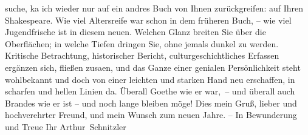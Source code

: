 \begin{ledgroupsized}[t]{13cm}
                        suche, ka{\geminationn} ich wieder nur auf ein andres
                        Buch von Ihnen zurückgreifen: auf Ihren Shakespeare. Wie viel Altersreife
                        war schon in dem früheren Buch, – wie viel Jugendfrische \introOben{}ist\introOben{} in diesem neuen. Welchen Glanz breiten Sie über
                        die Oberflächen; in welche Tiefen dringen Sie, ohne jemals dunkel zu werden.
                        {\pb}Kritische Betrachtung,
                        historischer Bericht, culturgeschichtliches Erfassen ergänzen sich, fließen
                        zusa{\geminationm}en, und das Ganze einer genialen
                        Persönlichkeit steht wohlbekannt und doch von einer leichten und starken
                        Hand neu erschaffen, in scharfen und hellen Linien da. Überall Goethe wie er
                        war, – und überall auch Brandes wie er ist – und noch lange bleiben möge!
                        Dies mein Gruß, lieber und hochverehrter Freund, und mein Wunsch zum neuen
                        Jahre. – In Bewunderung und Treue\pend
           \pstart Ihr \spacefill\mbox{Arthur Schnitzler}\pend{}
         
         \endnumbering{}\end{ledgroupsized}  \newcommand{\dateiname}{L02372}\newcommand{\titel}{Arthur Schnitzler an Georg Brandes, 28. 12. 1921}\newcommand{\editorInnen}{Martin Anton Müller und Gerd-Hermann Susen}
      